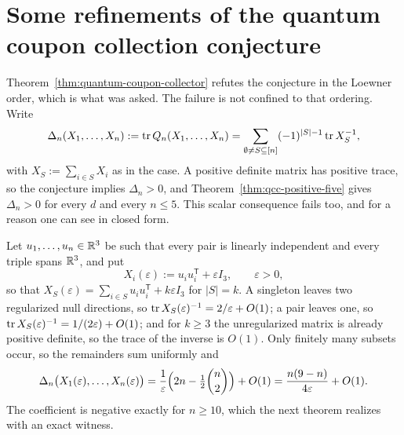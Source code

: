 \section{Some refinements of the quantum coupon collection conjecture}
\label{sec:qcctrace}

Theorem~\ref{thm:quantum-coupon-collector} refutes the conjecture in the Loewner order,
which is what was asked.  The failure is not confined to that ordering.  Write
\[
\Delta_n(X_1,\ldots,X_n):=\operatorname{tr} Q_n(X_1,\ldots,X_n)
=\sum_{\emptyset\ne S\subseteq[n]}(-1)^{|S|-1}\operatorname{tr} X_S^{-1},
\]
with $X_S:=\sum_{i\in S}X_i$ as in the case.  A positive definite matrix has
positive trace, so the conjecture implies $\Delta_n>0$, and
Theorem~\ref{thm:qcc-positive-five} gives $\Delta_n>0$ for every $d$ and every $n\le5$.
This scalar consequence fails too, and for a reason one can see in closed form.

Let $u_1,\ldots,u_n\in\mathbb R^3$ be such that every pair is linearly independent and every triple spans $\mathbb R^3$, and put
\[
X_i(\varepsilon):=u_iu_i^{\mathsf T}+\varepsilon I_3,\qquad\varepsilon>0,
\]
so that $X_S(\varepsilon)=\sum_{i\in S}u_iu_i^{\mathsf T}+k\varepsilon I_3$ for $|S|=k$.  A singleton leaves two regularized null directions, so $\operatorname{tr} X_S(\varepsilon)^{-1}=2/\varepsilon+O(1)$; a pair leaves one, so $\operatorname{tr} X_S(\varepsilon)^{-1}=1/(2\varepsilon)+O(1)$; and for $k\ge3$ the unregularized matrix is already positive definite, so the trace of the inverse is $O(1)$.  Only finitely many subsets occur, so the remainders sum uniformly and
\begin{equation}\label{eq:qcc-asymptotic}
\Delta_n\bigl(X_1(\varepsilon),\ldots,X_n(\varepsilon)\bigr)
=\frac1\varepsilon\Bigl(2n-\tfrac12\binom n2\Bigr)+O(1)
=\frac{n(9-n)}{4\varepsilon}+O(1).
\end{equation}
The coefficient is negative exactly for $n\ge10$, which the next theorem realizes with an exact witness.

